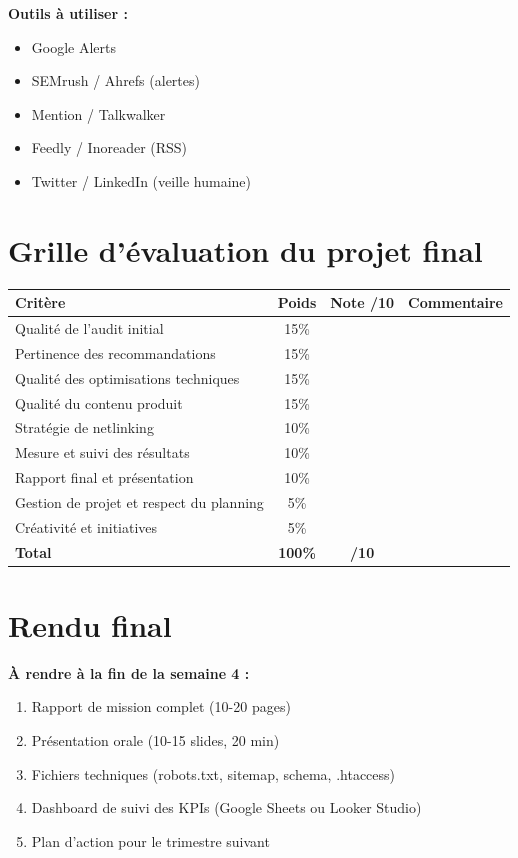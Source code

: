 \documentclass[12pt,a4paper]{report}
\begin{document}
\textbf{Outils à utiliser :}
\begin{itemize}
\item Google Alerts
\item SEMrush / Ahrefs (alertes)
\item Mention / Talkwalker
\item Feedly / Inoreader (RSS)
\item Twitter / LinkedIn (veille humaine)
\end{itemize}

\section{Grille d'évaluation du projet final}

\begin{tabular}{|l|c|c|c|}
\hline
\textbf{Critère} & \textbf{Poids} & \textbf{Note /10} & \textbf{Commentaire} \\
\hline
Qualité de l'audit initial & 15\% & & \\
\hline
Pertinence des recommandations & 15\% & & \\
\hline
Qualité des optimisations techniques & 15\% & & \\
\hline
Qualité du contenu produit & 15\% & & \\
\hline
Stratégie de netlinking & 10\% & & \\
\hline
Mesure et suivi des résultats & 10\% & & \\
\hline
Rapport final et présentation & 10\% & & \\
\hline
Gestion de projet et respect du planning & 5\% & & \\
\hline
Créativité et initiatives & 5\% & & \\
\hline
\textbf{Total} & \textbf{100\%} & \textbf{/10} & \\
\hline
\end{tabular}

\section{Rendu final}

\textbf{À rendre à la fin de la semaine 4 :}
\begin{enumerate}
\item Rapport de mission complet (10-20 pages)
\item Présentation orale (10-15 slides, 20 min)
\item Fichiers techniques (robots.txt, sitemap, schema, .htaccess)
\item Dashboard de suivi des KPIs (Google Sheets ou Looker Studio)
\item Plan d'action pour le trimestre suivant
\end{enumerate}
\end{document}
